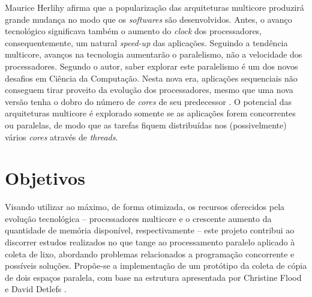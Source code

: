 \documentclass[ccc, pg2]{esinucpel}
\begin{document}
Maurice Herlihy \cite{bib:herlihy:theart} afirma que a popularização das arquiteturas multicore produzirá grande mudança no modo que os \textit{softwares} são desenvolvidos. Antes, o avanço tecnológico significava também o aumento do \textit{clock} dos processadores, consequentemente, um natural \textit{speed-up} das aplicações. Seguindo a tendência multicore, avanços na tecnologia aumentarão o paralelismo, não a velocidade dos processadores. Segundo o autor, saber explorar este paralelismo é um dos novos desafios em Ciência da Computação. Nesta nova era, aplicações sequenciais não conseguem tirar proveito da evolução dos processadores, mesmo que uma nova versão tenha o dobro do número de \textit{cores} de seu predecessor \cite{bib:dubois:erad}. O potencial das arquiteturas multicore é explorado somente se as aplicações forem concorrentes ou paralelas, de modo que as tarefas fiquem distribuídas nos (possivelmente) vários \textit{cores} através de \textit{threads}.


\section{Objetivos}
Visando utilizar ao máximo, de forma otimizada, os recursos oferecidos pela evolução tecnológica -- processadores multicore e o crescente aumento da quantidade de memória disponível, respectivamente -- este projeto contribui ao discorrer estudos realizados no que tange ao processamento paralelo aplicado à coleta de lixo, abordando problemas relacionados a programação concorrente e possíveis soluções. Propõe-se a implementação de um protótipo da coleta de cópia de dois espaços paralela, com base na estrutura apresentada por Christine Flood e David Detlefs \cite{bib:flood:pargc}.
\end{document}
